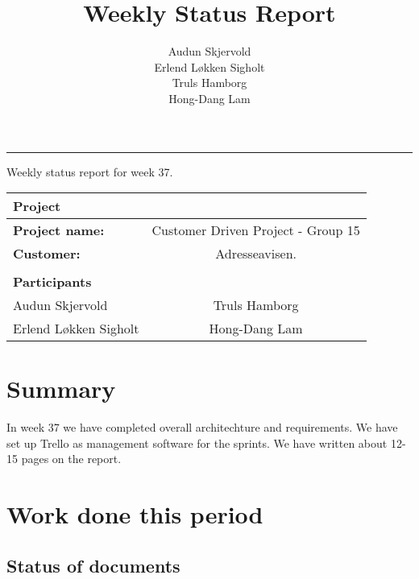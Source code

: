 \documentclass[12pt, a4paper]{article}
\title{Weekly Status Report}
\author{Audun Skjervold \\ Erlend Løkken Sigholt \\ Truls Hamborg \\ Hong-Dang Lam}
\begin{document}
\maketitle
\newpage

 
\newpage
\hrule
\newpage

\begin{center}
Weekly status report for week 37.
  \begin{tabular}{| l  c |}
    \hline
    Project & \\ \hline
    \textbf{Project name:} & Customer Driven Project - Group 15 \\
    \textbf{Customer:} & Adresseavisen. \\ \hline
     & \\
     \textbf{Participants} & \\ \hline
     Audun Skjervold & Truls Hamborg \\
     Erlend Løkken Sigholt & Hong-Dang Lam \\
    \hline
  \end{tabular}
  \end{center}




\section{Summary}
In week 37 we have completed overall architechture and requirements. We have set up Trello as management
software for the sprints. We have written about 12-15 pages on the report.
\section{Work done this period}
\subsection{Status of documents}
\end{document}
